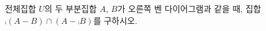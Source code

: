 \noindent\begin{minipage}[t]{0.58\linewidth}\vspace{0pt}\raggedright 전체집합 $U$의 두 부분집합 $A$, $B$가 오른쪽 벤 다이어그램과 같을 때, 집합 $\comp{(A-B)}\cap(A-\comp{B})$를 구하시오.\end{minipage}\hfill\begin{minipage}[t]{0.4\linewidth}\vspace{0pt}\centering \resizebox{\ifdim\width>\linewidth\linewidth\else\width\fi}{!}{}\end{minipage}\par
